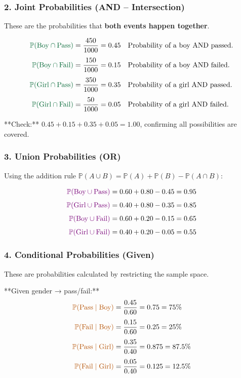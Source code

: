 \documentclass[12pt,a4paper,oneside]{report}
\theoremstyle{mytheorem}
\theoremstyle{mydefinition}
\theoremstyle{myremark}
\newcommand{\Prob}{\mathbb{P}}
\begin{document}
\subsubsection*{2. Joint Probabilities (AND – Intersection)}
These are the probabilities that \textbf{both events happen together}.

\[
\begin{aligned}
\color{mygreen} \Prob(\text{Boy} \cap \text{Pass}) &= \frac{450}{1000} = 0.45
    \quad\text{Probability of a boy AND passed.} \\[4pt]
\color{mygreen} \Prob(\text{Boy} \cap \text{Fail}) &= \frac{150}{1000} = 0.15
    \quad\text{Probability of a boy AND failed.} \\[4pt]
\color{mygreen} \Prob(\text{Girl} \cap \text{Pass}) &= \frac{350}{1000} = 0.35
    \quad\text{Probability of a girl AND passed.} \\[4pt]
\color{mygreen} \Prob(\text{Girl} \cap \text{Fail}) &= \frac{50}{1000} = 0.05
    \quad\text{Probability of a girl AND failed.}
\end{aligned}
\]

**Check:** $0.45 + 0.15 + 0.35 + 0.05 = 1.00$, confirming all possibilities are covered.

\subsubsection*{3. Union Probabilities (OR)}
Using the addition rule $\Prob(A \cup B) = \Prob(A) + \Prob(B) - \Prob(A \cap B)$:

\[
\begin{aligned}
\color{mypurple} \Prob(\text{Boy} \cup \text{Pass})
&= 0.60 + 0.80 - 0.45 = 0.95 \\[4pt]
\color{mypurple} \Prob(\text{Girl} \cup \text{Pass})
&= 0.40 + 0.80 - 0.35 = 0.85 \\[4pt]
\color{mypurple} \Prob(\text{Boy} \cup \text{Fail})
&= 0.60 + 0.20 - 0.15 = 0.65 \\[4pt]
\color{mypurple} \Prob(\text{Girl} \cup \text{Fail})
&= 0.40 + 0.20 - 0.05 = 0.55
\end{aligned}
\]

\subsubsection*{4. Conditional Probabilities (Given)}
These are probabilities calculated by restricting the sample space.

**Given gender → pass/fail:**
\[
\begin{aligned}
\color{myorange} \Prob(\text{Pass} \mid \text{Boy})
&= \frac{0.45}{0.60} = 0.75 = 75\% \\[4pt]
\color{myorange} \Prob(\text{Fail} \mid \text{Boy})
&= \frac{0.15}{0.60} = 0.25 = 25\% \\[4pt]
\color{myorange} \Prob(\text{Pass} \mid \text{Girl})
&= \frac{0.35}{0.40} = 0.875 = 87.5\% \\[4pt]
\color{myorange} \Prob(\text{Fail} \mid \text{Girl})
&= \frac{0.05}{0.40} = 0.125 = 12.5\%
\end{aligned}
\]
\end{document}

